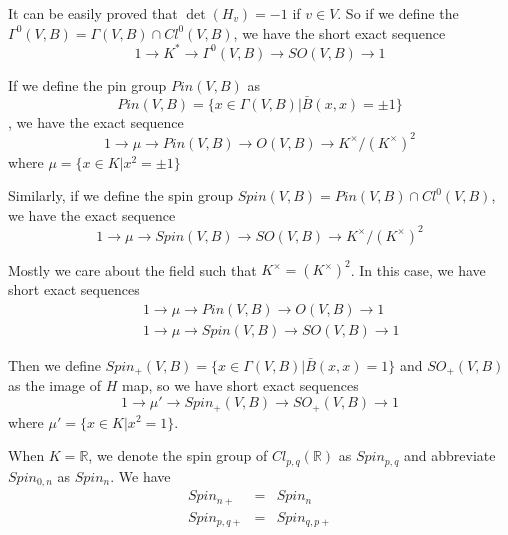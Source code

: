 \documentclass[12pt]{book}
\begin{document}
	It can be easily proved that $\det(H_v)=-1$ if $v\in V$. So if we define the $\Gamma^0(V,B)=\Gamma(V,B)\cap Cl^0(V,B)$,  we have the short exact sequence
	\begin{equation}
		1\rightarrow K^*\rightarrow \Gamma^0(V,B)\rightarrow SO(V,B)\rightarrow 1
	\end{equation}
	
	If we define the pin group $Pin(V,B)$ as
	\begin{equation}
		Pin(V,B)=\{x\in\Gamma(V,B)|\bar B(x,x)=\pm1\}
	\end{equation}
	, we have the exact sequence
	\begin{equation}
		1\rightarrow \mu\rightarrow Pin(V,B)\rightarrow O(V,B)\rightarrow K^\times/(K^\times)^2
	\end{equation}
	where $\mu=\{x\in K|x^2=\pm1\}$
	
	Similarly, if we define the spin group $Spin(V,B)=Pin(V,B)\cap Cl^0(V,B)$, we have the exact sequence
	\begin{equation}
		1\rightarrow \mu\rightarrow Spin(V,B)\rightarrow SO(V,B)\rightarrow K^\times/(K^\times)^2
	\end{equation}
	
	Mostly we care about the field such that $K^\times=(K^\times)^2$. In this case, we have short exact sequences
	\begin{eqnarray}
		&&1\rightarrow \mu\rightarrow Pin(V,B)\rightarrow O(V,B)\rightarrow 1\\
		&&1\rightarrow \mu\rightarrow Spin(V,B)\rightarrow SO(V,B)\rightarrow 1
	\end{eqnarray}
	
	Then we define $Spin_+(V,B)=\{x\in\Gamma(V,B)|\bar B(x,x)=1\}$ and $SO_+(V,B)$ as the image of $H$ map, so we have short exact sequences
	\begin{equation}
		1\rightarrow \mu'\rightarrow Spin_+(V,B)\rightarrow SO_+(V,B)\rightarrow 1
	\end{equation}
	where $\mu'=\{x\in K|x^2=1\}$.
	
	When $K=\mathbb R$, we denote the spin group of $Cl_{p,q}(\mathbb R)$ as $Spin_{p,q}$ and abbreviate $Spin_{0,n}$ as $Spin_n$. We have
	\begin{eqnarray}
		Spin_{n+}&=&Spin_n\\
		Spin_{p,q+}&=&Spin_{q,p+}
	\end{eqnarray}
	
\end{document}
